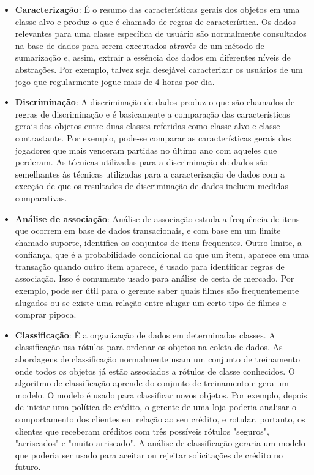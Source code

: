 \begin{itemize}
  \item 
\textbf{Caracterização}: É o resumo das características gerais dos objetos em uma classe alvo e produz o que é chamado de regras de característica. Os dados relevantes para uma classe específica de usuário são normalmente consultados na base de dados para serem executados através de um método de sumarização e, assim, extrair a essência dos dados em diferentes níveis de abstrações. Por exemplo, talvez seja desejável caracterizar os usuários de um jogo que regularmente jogue mais de 4 horas por dia.  
  \item 
\textbf{Discriminação}: A discriminação de dados produz o que são chamados de regras de discriminação e é basicamente a comparação das características gerais dos objetos entre duas classes referidas como classe alvo e classe contrastante. Por exemplo, pode-se comparar as características gerais dos jogadores que mais venceram partidas no último ano com aqueles que perderam. As técnicas utilizadas para a discriminação de dados são semelhantes às técnicas utilizadas para a caracterização de dados com a exceção de que os resultados de discriminação de dados incluem medidas comparativas.  
  \item 
\textbf{Análise de associação}: Análise de associação estuda a frequência de itens que ocorrem em base de dados transacionais, e com base em um limite chamado suporte, identifica os conjuntos de itens frequentes. Outro limite, a confiança, que é a probabilidade condicional do que um item, aparece em uma transação quando outro item aparece, é usado para identificar regras de associação. Isso é comumente usado para análise de cesta de mercado. Por exemplo, pode ser útil para o gerente saber quais filmes são frequentemente alugados ou se existe uma relação entre alugar um certo tipo de filmes e comprar pipoca.  
  \item 
\textbf{Classificação}: É a organização de dados em determinadas classes. A classificação usa rótulos  para ordenar os objetos na coleta de dados. As abordagens de classificação normalmente usam um conjunto de treinamento onde todos os objetos já estão associados a rótulos de classe conhecidos. O algoritmo de classificação aprende do conjunto de treinamento e gera um modelo. O modelo é usado para classificar novos objetos. Por exemplo, depois de iniciar uma política de crédito, o gerente de uma loja poderia analisar o comportamento dos clientes em relação ao seu crédito, e rotular, portanto, os clientes que receberam créditos com três possíveis rótulos "seguros", "arriscados" e "muito arriscado". A análise de classificação geraria um modelo que poderia ser usado para aceitar ou rejeitar solicitações de crédito no futuro.  

\end{itemize}
